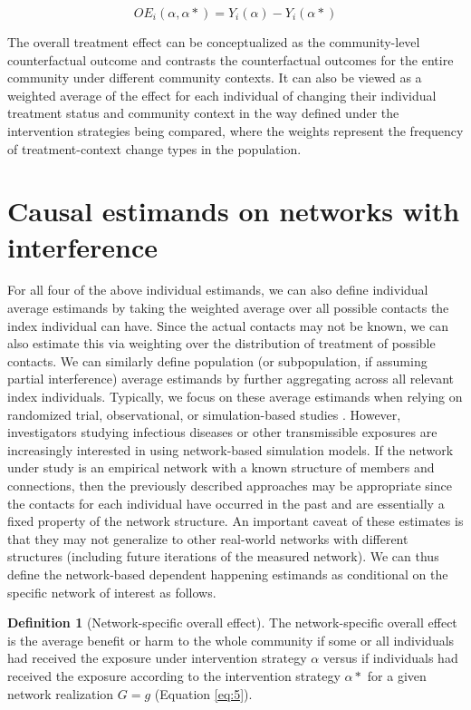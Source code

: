 \documentclass{article}
\theoremstyle{definition}
\newtheorem{definition}{Definition}[section]
\begin{document}
\begin{equation}\label{eq:4}
   OE_{i}\left(\alpha,\alpha*\right) = Y_{i}\left(\alpha\right) - Y_{i}\left(\alpha*\right)	
\end{equation}

The overall treatment effect can be conceptualized as the community-level counterfactual outcome and contrasts the counterfactual outcomes for the entire community under different community contexts. It can also be viewed as a weighted average of the effect for each individual of changing their individual treatment status and community context in the way defined under the intervention strategies being compared, where the weights represent the frequency of treatment-context change types in the population.


\section{Causal estimands on networks with interference}
For all four of the above individual estimands, we can also define individual average estimands by taking the weighted average over all possible contacts the index individual can have. Since the actual contacts may not be known, we can also estimate this via weighting over the distribution of treatment of possible contacts. We can similarly define population (or subpopulation, if assuming partial interference) average estimands by further aggregating across all relevant index individuals. Typically, we focus on these average estimands when relying on randomized trial, observational, or simulation-based studies \cite{halloran_dependent_2016, murray_emulating_2021, buchanan_disseminated_2021}.
However, investigators studying infectious diseases or other transmissible exposures are increasingly interested in using network-based simulation models. If the network under study is an empirical network with a known structure of members and connections, then the previously described approaches may be appropriate since the contacts for each individual have occurred in the past and are essentially a fixed property of the network structure. An important caveat of these estimates is that they may not generalize to other real-world networks with different structures (including future iterations of the measured network). We can thus define the network-based dependent happening estimands as conditional on the specific network of interest as follows. 

\begin{definition}[Network-specific overall effect] The network-specific overall effect is the average benefit or harm to the whole community if some or all individuals had received the exposure under intervention strategy $\alpha$ versus if individuals had received the exposure according to the intervention strategy $\alpha*$ for a given network realization $G=g$ (Equation \ref{eq:5}).
\end{definition}
\end{document}
